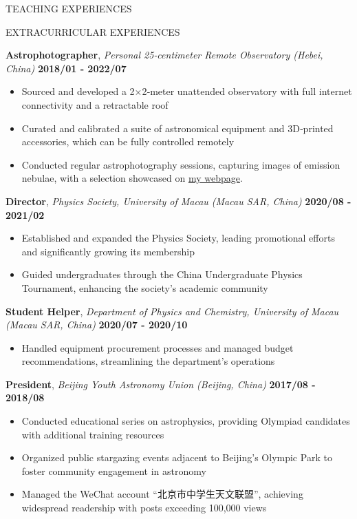 \documentclass[10pt]{article} %
\begin{document}
\begin{section}{TEACHING EXPERIENCES}
\end{section}

\begin{section}{EXTRACURRICULAR EXPERIENCES}
    
\textbf{Astrophotographer}, \textit{Personal 25‑centimeter Remote Observatory (Hebei, China)} \hfill \textbf{2018/01 ‑ 2022/07}
\begin{itemize}[leftmargin=1.5em]
    \item Sourced and developed a 2$\times$2‑meter unattended observatory with full internet connectivity and a retractable roof
    \item Curated and calibrated a suite of astronomical equipment and 3D‑printed accessories, which can be fully controlled remotely
    \item Conducted regular astrophotography sessions, capturing images of emission nebulae, with a selection showcased on \href{https://yliu.fit/astrophotography/}{my webpage}.
\end{itemize}

\textbf{Director}, \textit{Physics Society, University of Macau (Macau SAR, China)} \hfill \textbf{2020/08 - 2021/02} 
\begin{itemize}[leftmargin=1.5em]
    \item Established and expanded the Physics Society, leading promotional efforts and significantly growing its membership
    \item Guided undergraduates through the China Undergraduate Physics Tournament, enhancing the society's academic community
\end{itemize}

\textbf{Student Helper}, \textit{Department of Physics and Chemistry, University of Macau (Macau SAR, China)} \hfill \textbf{2020/07 - 2020/10} 
\begin{itemize}[leftmargin=1.5em]
    \item Handled equipment procurement processes and managed budget recommendations, streamlining the department's operations
\end{itemize}

\textbf{President}, \textit{Beijing Youth Astronomy Union (Beijing, China)} \hfill \textbf{2017/08 - 2018/08} 
\begin{itemize}[leftmargin=1.5em]
    \item Conducted educational series on astrophysics, providing Olympiad candidates with additional training resources
    \item Organized public stargazing events adjacent to Beijing’s Olympic Park to foster community engagement in astronomy
    \item Managed the WeChat account ``北京市中学生天文联盟'', achieving widespread readership with posts exceeding 100,000 views
\end{itemize}


\end{section}
\end{document}
